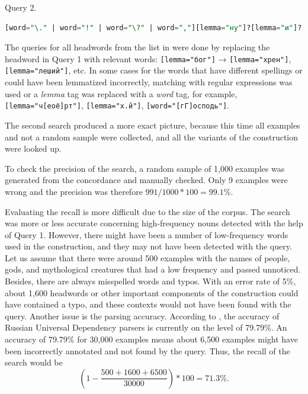 \documentclass[output=paper]{langscibook}
\begin{document}
\ea
Query 2.
\begin{lstlisting}[language=SQL]
[word="\." | word="!" | word="\?" | word=","][lemma="ну"]?[lemma="и"]?[lemma="бог"][word="с" | word="со"][tag="P....i.*" | tag="N...i.*"][word="\." | word="!" | word="\?" | word=";" | word=","]
\end{lstlisting}
\z

The queries for all headwords from the list in  were done by replacing the headword in Query 1 with relevant words: \texttt{[lemma="бог"]} → \texttt{[lemma="хрен"]}, \texttt{[lemma="леший"]}, etc. In some cases for the words that have different spellings or could have been lemmatized incorrectly, matching with regular expressions was used or a \textit{lemma} tag was replaced with a \textit{word} tag, for example, \texttt{[lemma="ч[е{\textbar}о{\textbar}ё]рт"]}, \texttt{[lemma="х.й"]}, \texttt{[word="[г{\textbar}Г]осподь"]}.

The second search produced a more exact picture, because this time all examples and not a random sample were collected, and all the variants of the construction were looked up.

To check the precision of the search, a random sample of 1,000 examples was generated from the concordance and manually checked. Only 9 examples were wrong and the precision was therefore $991/1000*100 = 99.1\%$.

Evaluating the recall is more difficult due to the size of the corpus. The search was more or less accurate concerning high-frequency nouns detected with the help of Query 1. However, there might have been a number of low-frequency words used in the construction, and they may not have been detected with the query. Let us assume that there were around 500 examples with the names of people, gods, and mythological creatures that had a low frequency and passed unnoticed. Besides, there are always misspelled words and typos. With an error rate of 5\%, about 1,600 headwords or other important components of the construction could have contained a typo, and these contexts would not have been found with the query. Another issue is the parsing accuracy. According to \citet{NivreFang2017}, the accuracy of Russian Universal Dependency parsers is currently on the level of 79.79\%. An accuracy of 79.79\% for 30,000 examples means about 6,500 examples might have been incorrectly annotated and not found by the query. Thus, the recall of the search would be  \[ \left(1-\frac{500+1600+6500}{30000}\right)*100 = 71.3\%.\] 
\end{document}
